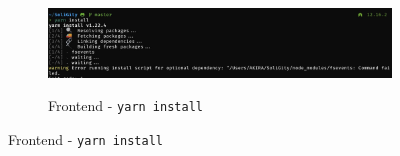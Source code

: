 \documentclass[12pt]{article}
\renewcommand{\_}{\kern-1.5pt\textunderscore\kern-1.5pt}
\begin{document}
\begin{figure}[H]
\begin{minipage}[t]{0.5\linewidth}
\begin{subfigure}[b]{\textwidth}
			\includegraphics[width=\textwidth]{graphs/02. yarn_install_backend}

		\end{subfigure}


					\begin{subfigure}[b]{\textwidth}
				\captionsetup{justification   = raggedright,
              singlelinecheck = false}
			\centering
						\caption*{Frontend - \texttt{yarn install}}


\end{subfigure}
\end{minipage}
\end{figure}
\end{document}
